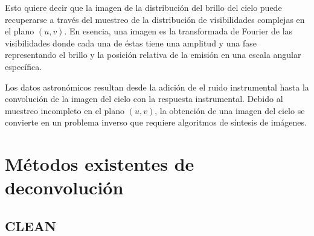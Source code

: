 Esto quiere decir que la imagen de la distribución del brillo del cielo puede recuperarse a través del muestreo de la distribución de visibilidades complejas en el plano $(u,v)$. En esencia, una imagen es la transformada de Fourier de las visibilidades donde cada una de éstas tiene una amplitud y una fase representando el brillo y la posición relativa de la emisión en una escala angular específica.






Los datos astronómicos resultan desde la adición de el ruido instrumental hasta la convolución de la imagen del cielo con la respuesta instrumental. Debido al muestreo incompleto en el plano $(u,v)$, la obtención de una imagen del cielo se convierte en un problema inverso que requiere algoritmos de síntesis de imágenes. 


\section{Métodos existentes de deconvolución} 

\subsection{CLEAN}

